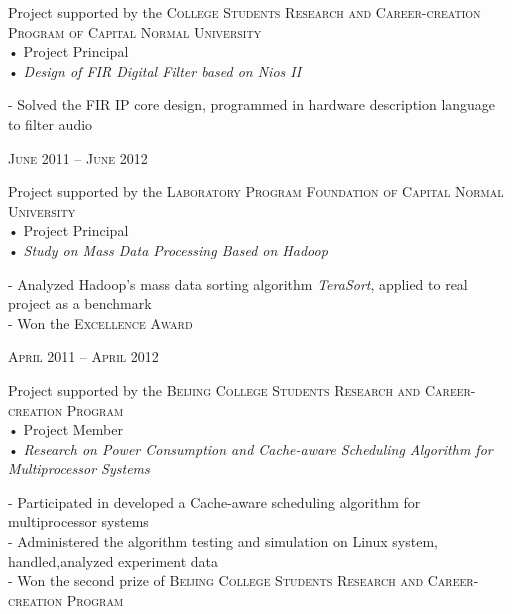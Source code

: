 \documentclass[10pt]{article} %
\begin{document}
\begin{minipage}[t]{0.5\textwidth}
{\raggedright Project supported by the \textsc{College Students Research and Career-creation Program of Capital Normal University}\\
 • Project Principal\\
 • \textit{Design of FIR Digital Filter based on Nios II}\\}

\normalsize{
-  Solved the FIR IP core design, programmed in hardware description language to filter audio
}\\

{\raggedleft\textsc{June 2011 -- June 2012}\par}

{\raggedright Project supported by the \textsc{Laboratory Program Foundation of Capital Normal University}\\
 • Project Principal\\
 • \textit{Study on Mass Data Processing Based on Hadoop}\\}

\normalsize{
-  Analyzed Hadoop's mass data sorting algorithm \textit{TeraSort}, applied to real project as a benchmark\\
-  Won the \textsc{Excellence Award}}\\


{\raggedleft\textsc{April 2011 -- April 2012}\par}

{\raggedright Project supported by the \textsc{Beijing College Students Research and Career-creation Program} \\
 • Project Member\\
 • \textit{Research on Power Consumption and Cache-aware Scheduling Algorithm for Multiprocessor Systems}\\}

\normalsize{
-  Participated in developed  a Cache-aware scheduling algorithm for multiprocessor systems\\
-  Administered the algorithm testing and simulation on Linux system, handled,analyzed experiment data\\
-  Won the second prize of \textsc{Beijing College Students Research and Career-creation Program}
}\\


\end{minipage}
\end{document}
